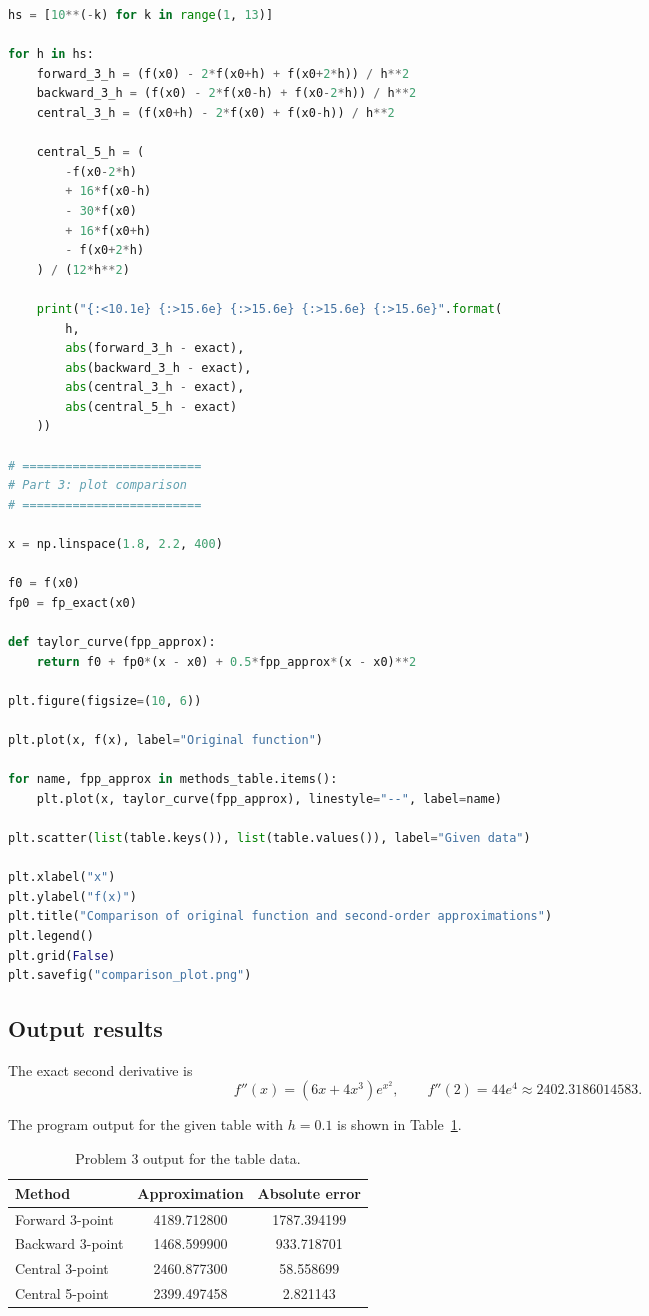 \documentclass[12pt,a4paper]{article}
\begin{document}
\begin{lstlisting}[language=Python,caption={Excerpt from hw7\_3/main.py.}]
hs = [10**(-k) for k in range(1, 13)]

for h in hs:
    forward_3_h = (f(x0) - 2*f(x0+h) + f(x0+2*h)) / h**2
    backward_3_h = (f(x0) - 2*f(x0-h) + f(x0-2*h)) / h**2
    central_3_h = (f(x0+h) - 2*f(x0) + f(x0-h)) / h**2

    central_5_h = (
        -f(x0-2*h)
        + 16*f(x0-h)
        - 30*f(x0)
        + 16*f(x0+h)
        - f(x0+2*h)
    ) / (12*h**2)

    print("{:<10.1e} {:>15.6e} {:>15.6e} {:>15.6e} {:>15.6e}".format(
        h,
        abs(forward_3_h - exact),
        abs(backward_3_h - exact),
        abs(central_3_h - exact),
        abs(central_5_h - exact)
    ))

# =========================
# Part 3: plot comparison
# =========================

x = np.linspace(1.8, 2.2, 400)

f0 = f(x0)
fp0 = fp_exact(x0)

def taylor_curve(fpp_approx):
    return f0 + fp0*(x - x0) + 0.5*fpp_approx*(x - x0)**2

plt.figure(figsize=(10, 6))

plt.plot(x, f(x), label="Original function")

for name, fpp_approx in methods_table.items():
    plt.plot(x, taylor_curve(fpp_approx), linestyle="--", label=name)

plt.scatter(list(table.keys()), list(table.values()), label="Given data")

plt.xlabel("x")
plt.ylabel("f(x)")
plt.title("Comparison of original function and second-order approximations")
plt.legend()
plt.grid(False)
plt.savefig("comparison_plot.png")
\end{lstlisting}

\subsection{Output results}

The exact second derivative is
\[
f''(x)=(6x+4x^3)e^{x^2}, \qquad f''(2)=44e^4\approx 2402.3186014583.
\]

The program output for the given table with $h=0.1$ is shown in Table~\ref{tab:p3table}.

\begin{table}[H]
\centering
\caption{Problem 3 output for the table data.}
\label{tab:p3table}
\begin{tabular}{lcc}
\toprule
Method & Approximation & Absolute error \\
\midrule
Forward 3-point & 4189.712800 & 1787.394199 \\
Backward 3-point & 1468.599900 & 933.718701 \\
Central 3-point & 2460.877300 & 58.558699 \\
Central 5-point & 2399.497458 & 2.821143 \\
\bottomrule
\end{tabular}
\end{table}
\end{document}
